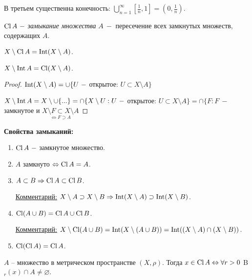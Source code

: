 \begin{remark}
    В третьем существенна конечность: $\bigcup\limits_{n=1}^\infty[\frac{1}{n}, 1]=(0,\frac{1}{n})$.
\end{remark}

\begin{definition}
    $\operatorname{Cl} A\ -$ \textit{замыкание множества} $A\ -$ пересечение всех замкнутых множеств, содержащих $A$.
\end{definition}

\begin{theorem}
    $X\setminus \operatorname{Cl} A=\operatorname{Int} (X\setminus A)$.

    $X\setminus \operatorname{Int} A=\operatorname{Cl} (X\setminus A)$.
\end{theorem}

\begin{proof}
    $\operatorname{Int}(X\setminus A)=\cup\{U\ - $ открытое: $U\subset X\setminus A \}$

    $X\setminus \operatorname{Int} A=X \setminus \cup \{...\}=\cap \{X\setminus U: U\ - $ открытое: $U\subset X\setminus A \}=\cap \{ F : F\ - $ замкнутое и $\underset{\Leftrightarrow F \supset A}{X\setminus F \subset X\setminus A}$
\end{proof}

\begin{proper}
    \textbf{Свойства замыканий:}
    \begin{enumerate}
        \item $\operatorname{Cl} A\ -$ замкнутое множество.
        \item $A$ замкнуто $\Leftrightarrow \operatorname{Cl} A=A$.
        \item $A\subset B\Rightarrow \operatorname{Cl} A\subset \operatorname{Cl} B$.

        \underline{Комментарий:} $X\setminus A \supset X\setminus B \Rightarrow \operatorname{Int} (X\setminus A)\supset \operatorname{Int} (X\setminus B)$.
        \item $\operatorname{Cl} (A\cup B)=\operatorname{Cl} A\cup \operatorname{Cl} B$.

        \underline{Комментарий:} $X\setminus \operatorname{Cl}(A\cup B)=\operatorname{Int} (X\setminus (A\cup B))=\operatorname{Int} ((X\setminus A)\cap (X\setminus B))$.

        \item $\operatorname{Cl} (\operatorname{Cl} A)=\operatorname{Cl} A$.
    \end{enumerate}
\end{proper}

\begin{theorem}
    $A$ – множество в метрическом пространстве $(X, \rho)$. Тогда $x\in \operatorname{Cl} A\Leftrightarrow \forall r>0$ B$_r(x)\cap A\neq \varnothing$.
\end{theorem}

